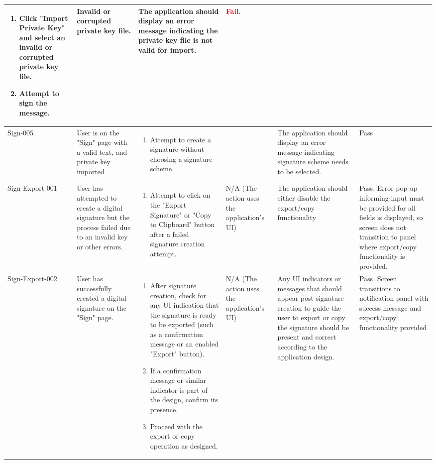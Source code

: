 \documentclass[]{final_report}
\theoremstyle{definition}
\begin{document}
\begin{longtable}{|l|p{2.5cm}|p{2.8cm}|p{2cm}|p{2cm}|p{2cm}|}
  \begin{enumerate}
    \item Click "Import Private Key" and select an invalid or corrupted private key file.
    \item Attempt to sign the message.
  \end{enumerate} & Invalid or corrupted private key file. & The application should display an error message indicating the private key file is not valid for import. & \textcolor{red}{Fail.} \\
  \hline
      Sign-005  & User is on the "Sign" page with a valid text, and private key imported & 
  \begin{enumerate}
    \item Attempt to create a signature without choosing a signature scheme.
  \end{enumerate} &
  & The application should display an error message indicating signature scheme needs to be selected. & Pass \\
    \hline
  Sign-Export-001 & User has attempted to create a digital signature but the process failed due to an invalid key or other errors. & 
  \begin{enumerate}
    \item Attempt to click on the "Export Signature" or "Copy to Clipboard" button after a failed signature creation attempt.
  \end{enumerate} & N/A (The action uses the application's UI) & The application should either disable the export/copy functionality & Pass. Error pop-up informing input must be provided for all fields is displayed, so screen does not transition to panel where export/copy functionality is provided.  \\
  \hline
  Sign-Export-002 & User has successfully created a digital signature on the "Sign" page. & 
  \begin{enumerate}
    \item After signature creation, check for any UI indication that the signature is ready to be exported (such as a confirmation message or an enabled "Export" button).
    \item If a confirmation message or similar indicator is part of the design, confirm its presence.
    \item Proceed with the export or copy operation as designed.
  \end{enumerate} & N/A (The action uses the application's UI) & Any UI indicators or messages that should appear post-signature creation to guide the user to export or copy the signature should be present and correct according to the application design. & Pass. Screen transitions to notification panel with success message and export/copy functionality provided \\

\end{longtable}
\end{document}
